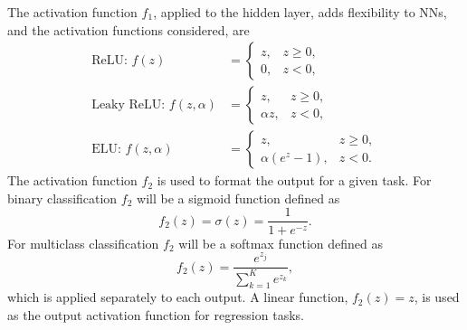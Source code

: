 \documentclass[conference]{IEEEtran}
\begin{document}
	The activation function $f_1$, applied to the hidden layer, adds flexibility to NNs, and the activation functions considered, are 
	\begin{align}
		\text{ReLU: } f(z) &=
		\begin{cases}
			z, & z \geq 0,\\
			0, & z < 0,
		\end{cases}\\
		\text{Leaky ReLU: } f(z,\alpha) &=
		\begin{cases}
			z, & z \geq 0,\\
			\alpha z, & z < 0,
		\end{cases}\\
		\text{ELU: } f(z,\alpha) &=
		\begin{cases}
			z, & z \geq 0,\\
			\alpha(e^z-1), & z < 0.
		\end{cases}
	\end{align}
	The activation function $f_2$ is used to format the output for a given task. For binary classification $f_2$ will be a sigmoid function defined as \[f_2(z) = \sigma(z) = \frac{1}{1+e^{-z}}.\] For multiclass classification $f_2$ will be a softmax function defined as \[f_2(z) = \frac{e^{z_j}}{\sum_{k=1}^{K} e^{z_k}},\] which is applied separately to each output. A linear function, $f_2(z) = z$, is used as the output activation function for regression tasks.
	
\end{document}
